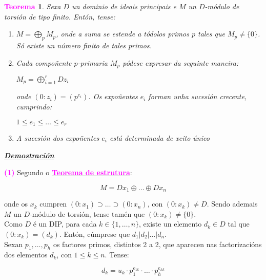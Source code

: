 \documentclass[twoside]{report}
\newcommand{\magbf}[1]{\textcolor{magenta}{\textbf{#1}}} %
\theoremstyle{mystyle}
\newtheorem{theo}{\magbf{Teorema}}[chapter]
\newenvironment{theorem}
{\begin{mdframed}[linecolor = magenta,backgroundcolor = classicrose, linewidth = 2mm]\begin{theo}}
{\end{theo}\end{mdframed}}
\begin{document}
\begin{theorem} \label{th4.3}
Sexa $D$ un dominio de ideais principais e $M$ un $D$-módulo de torsión de tipo finito. Entón, tense:
\begin{enumerate}
    \item $M = \displaystyle \bigoplus_{p}M_{p}$, onde a suma se estende a tódolos primos $p$ tales que $M_{p} \neq \{0\}$. Só existe un número finito de tales primos.
    \item Cada compoñente $p$-primaria $M_{p}$ pódese expresar da seguinte maneira:
        \begin{center}
            $M_{p} = \displaystyle \bigoplus_{i = 1}^{r}Dz_{i}$
        \end{center}
    onde $(0 : z_{i}) = (p^{e_{i}})$. Os expoñentes $e_{i}$ forman unha sucesión crecente, cumprindo:
        \begin{center}
            $1 \leq e_{1} \leq \ldots \leq e_{r}$
        \end{center}
    \item A sucesión dos expoñentes $e_{i}$ está determinada de xeito único
\end{enumerate}
\end{theorem}

\vspace{2mm}

\noindent \textbf{\textit{\underline{Demostración}}}

\vspace{2mm}

\noindent \magbf{(1)} Segundo o \hyperref[th4.2]{\magbf{Teorema de estrutura}}:

$$M = Dx_{1} \oplus \ldots \oplus Dx_{n}$$

\noindent onde os $x_{k}$ cumpren $(0 : x_{1}) \supset \dots \supset (0 : x_{n})$, con $(0 : x_{k}) \neq D$. Sendo ademais $M$ un $D$-módulo de torsión, tense tamén que $(0 : x_{k}) \neq \{0\}$.\\

\noindent Como $D$ é un DIP, para cada $k \in \{1, \dots, n\}$, existe un elemento $d_{k} \in D$ tal que $(0 : x_{k}) = (d_{k})$. Entón, cúmprese que $d_{1} | d_{2} | \dots | d_{n}$.\\

\noindent Sexan $p_{1}, \dots, p_{h}$ os factores primos, distintos 2 a 2, que aparecen nas factorizacións dos elementos $d_{k}$, con $1 \leq k \leq n$. Tense:

$$d_{k} = u_{k} \cdot p_{1}^{e_{1k}} \cdot \ldots \cdot p_{h}^{e_{hk}}$$
\end{document}
